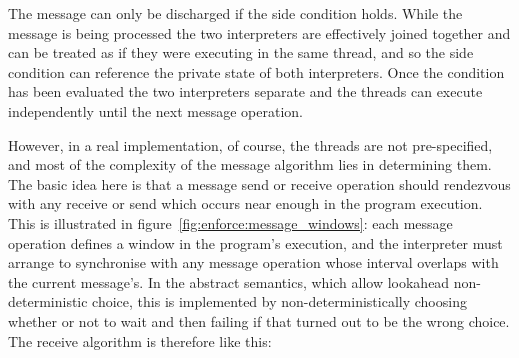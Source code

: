 The message can only be discharged if the side condition holds.  While
the message is being processed the two interpreters are effectively
joined together and can be treated as if they were executing in the
same thread, and so the side condition can reference the private state
of both interpreters.  Once the condition has been evaluated the two
interpreters separate and the threads can execute independently until the
next message operation.

However, in a real implementation, of course, the threads are not
pre-specified, and most of the complexity of the message algorithm
lies in determining them.  The basic idea here is that a message send
or receive operation should rendezvous with any receive or send which
occurs near enough in the program execution.  This is illustrated in
figure~\ref{fig:enforce:message_windows}: each message operation
defines a window in the program's execution, and the interpreter must
arrange to synchronise with any message operation whose interval
overlaps with the current message's.  In the abstract semantics, which
allow lookahead non-deterministic choice, this is implemented by
non-deterministically choosing whether or not to wait and then failing
if that turned out to be the wrong choice.  The receive algorithm is
therefore like this:

